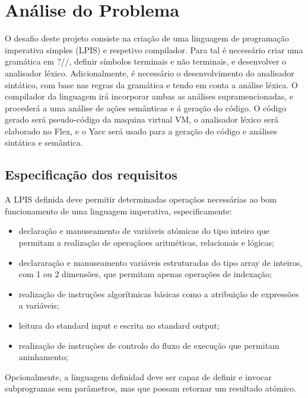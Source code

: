 \chapter{Análise do Problema}
\label{cap:analise}

O desafio deste projeto consiste na criação de uma linguagem de programação imperativa simples (LPIS) e respetivo compilador.
Para tal é necessário criar uma gramática em ?//, definir símbolos terminais e não terminais, e desenvolver o analisador léxico. Adicionalmente, é necessário o desenvolvimento do analisador sintático, com base nas regras da gramática e tendo em conta a análise léxica. O compilador da linguagem irá incorporar ambas as análises supramencionadas, e procederá a uma análise de ações semânticas e á geração do código. 
O código gerado será pseudo-código da maquina virtual VM, o analisador léxico será elaborado no Flex, e o Yacc será usado para a geração do código e análises sintática e semântica.   


\section{Especificação dos requisitos}
\label{sec:especificacao:analise}

A LPIS definida deve permitir determinadas operaçãos necessárias ao bom funcionamento de uma linguagem imperativa, especificamente:

\begin{itemize}
\item declaração e manuseamento de variáveis atómicas do tipo inteiro que permitam a realização de operaçãoes aritméticas, relacionais e lógicas;
\item declararação e manuseamento variáveis estruturadas do tipo array de inteiros, com 1 ou 2 dimensões, que permitam apenas operações de indexação;
\item realização de instruções algorítmicas básicas como a atribuição de expressões a variáveis;
\item leitura do standard input e escrita no standard output;
\item realização de instruções de controlo do fluxo de execução que permitam aninhamento;
\end{itemize}

Opcionalmente, a linguagem definidad deve ser capaz de definir e invocar subprogramas sem parâmetros, mas que possam retornar um resultado atómico.

\newpage

